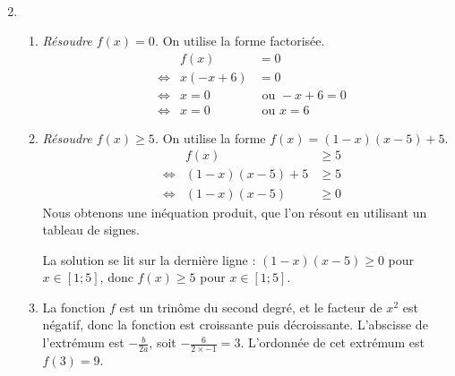 \documentclass[12pt]{article}
\begin{document}
\begin{exercice}
\begin{enumerate}
\begin{align*}
          \end{align*}
        \item~
          \begin{enumerate}
            \item \emph{Résoudre $f(x)=0$.} On utilise la forme factorisée.
          \begin{align*}
            && f(x) &= 0\\
            &\iff& x(-x+6)&=0\\
            &\iff& x=0 &\text{ ou } -x+6=0\\
            &\iff& x=0 &\text{ ou } x=6
          \end{align*}
        \item \emph{Résoudre $f(x)\geq5$.} On utilise la forme $f(x)=(1-x)(x-5)+5$.
          \begin{align*}
            && f(x) &\geq 5\\
            &\iff& (1-x)(x-5)+5 &\geq5\\
            &\iff& (1-x)(x-5) &\geq0
          \end{align*}
          Nous obtenons une inéquation produit, que l'on résout en utilisant un tableau de signes.
  \begin{center}
\end{center}
La solution se lit sur la dernière ligne : $(1-x)(x-5)\geq0$ pour $x\in\left[1;5\right]$, donc $f(x)\geq5$ pour $x\in\left[1;5\right]$.
\item
  \begin{multicols}{2}
    La fonction $f$ est un trinôme du second degré, et le facteur de $x^2$
    est négatif, donc la fonction est croissante puis décroissante.
    L'abscisse de l'extrémum est $-\frac{b}{2a}$, soit
    $-\frac{6}{2\times-1}=3$. L'ordonnée de cet extrémum est $f(3)=9$.

    \columnbreak

  \begin{center}
  \end{center}
\end{multicols}
          \end{enumerate}
  \end{enumerate}


\end{exercice}
\end{document}
